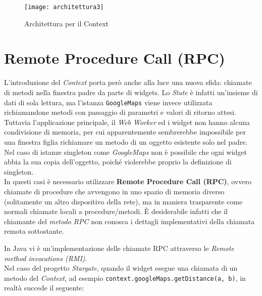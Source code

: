 \begin{figure}[H] 
  \centering 
  \texttt{[image: architettura3]} 
  \caption{Architettura per il Context}
\end{figure}

\section{Remote Procedure Call (RPC)}\label{rpc}

L'introduzione del \textit{Context} porta però anche alla luce una nuova sfida: chiamate di metodi nella finestra padre da parte di widgets. Lo \textit{State} è infatti un'insieme di dati di sola lettura, ma l'istanza \texttt{GoogleMaps} viene invece utilizzata richiamandone metodi con passaggio di parametri e valori di ritorno attesi. \\

Tuttavia l'applicazione principale, il \textit{Web Worker} ed i widget non hanno alcuna condivisione di memoria, per cui apparentemente sembrerebbe impossibile per una finestra figlia richiamare un metodo di un oggetto esistente solo nel padre. Nel caso di istanze singleton come \textit{GoogleMaps} non è possibile che ogni widget abbia la sua copia dell'oggetto, poiché violerebbe proprio la definizione di singleton. \\

In questi casi è necessario utilizzare \textbf{Remote Procedure Call (RPC)}, ovvero chiamate di procedure che avvengono in uno spazio di memoria diverso (solitamente un altro dispositivo della rete), ma in maniera trasparente come normali chiamate locali a procedure/metodi. È desiderabile infatti che il chiamante del \textit{metodo RPC} non conosca i dettagli implementativi della chiamata remota sottostante.

In Java vi è un'implementazione delle chiamate RPC attraverso le \textit{Remote method invocations (RMI)}. \\

Nel caso del progetto \textit{Stargate}, quando il widget esegue una chiamata di un metodo del \textit{Context}, ad esempio \texttt{context.googleMaps.getDistance(a, b)}, in realtà succede il seguente:

